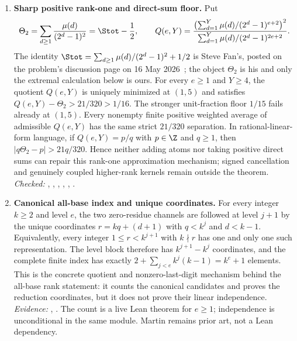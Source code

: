 {\begin{enumerate}[label=\textbf{R\arabic*.},ref=R\arabic*,leftmargin=2.4em,
  itemsep=0.2em,topsep=0.25em]
\item\label{res:rankonefloor} 
\textbf{Sharp positive rank-one and direct-sum floor.}  Put
\[
 \Theta_2=\sum_{d\ge1}\frac{\mu(d)}{(2^d-1)^2}=\Stot-\frac12,
 \qquad
 Q(e,Y)=
 \frac{\bigl(\sum_{d=1}^{Y}\mu(d)/(2^d-1)^{e+2}\bigr)^2}
      {\sum_{d=1}^{Y}\mu(d)/(2^d-1)^{2e+2}}.
\]
The identity $\Stot=\sum_{d\ge1}\mu(d)/(2^d-1)^2+1/2$ is Steve Fan's, posted on
the problem's discussion page on 16 May 2026~\cite{fan2026totient}; the object
$\Theta_2$ is his and only the extremal calculation below is ours.
For every $e\ge1$ and $Y\ge4$, the quotient $Q(e,Y)$ is uniquely minimized
at $(1,5)$ and satisfies $Q(e,Y)-\Theta_2>21/320>1/16$.  The stronger
unit-fraction floor $1/15$ fails already at $(1,5)$.  Every nonempty finite
positive weighted average of admissible $Q(e,Y)$ has the same strict
$21/320$ separation.  In rational-linear-form language, if
$Q(e,Y)=p/q$ with $p\in\Z$ and $q\ge1$, then
$|q\Theta_2-p|>21q/320$.  Hence neither adding atoms nor taking positive direct
sums can repair this rank-one approximation mechanism; signed cancellation
and genuinely coupled higher-rank kernels remain outside the theorem.
{\footnotesize\emph{Checked:}
,
,
,
,
,
.}

\item\label{res:index} 
\textbf{Canonical all-base index and unique coordinates.}  For every integer
$k\ge2$ and level $e$, the two zero-residue channels are followed at level
$j+1$ by the unique coordinates
$r=kq+(d+1)$ with $q<k^j$ and $d<k-1$.  Equivalently, every integer
$1\le r<k^{j+1}$ with $k\nmid r$ has one and only one such representation.
The level block therefore has $k^{j+1}-k^j$ coordinates, and the complete
finite index has exactly
$2+\sum_{j<e}k^j(k-1)=k^e+1$ elements.  This is the concrete quotient and
nonzero-last-digit mechanism behind the all-base rank statement: it counts
the canonical candidates and proves the reduction coordinates, but it does
not prove their linear independence.
{\footnotesize\emph{Evidence:}
,
.
The count is a live Lean theorem for $e\ge1$; independence is unconditional in the same module.  Martin remains prior art, not a Lean dependency.}


\end{enumerate}}
